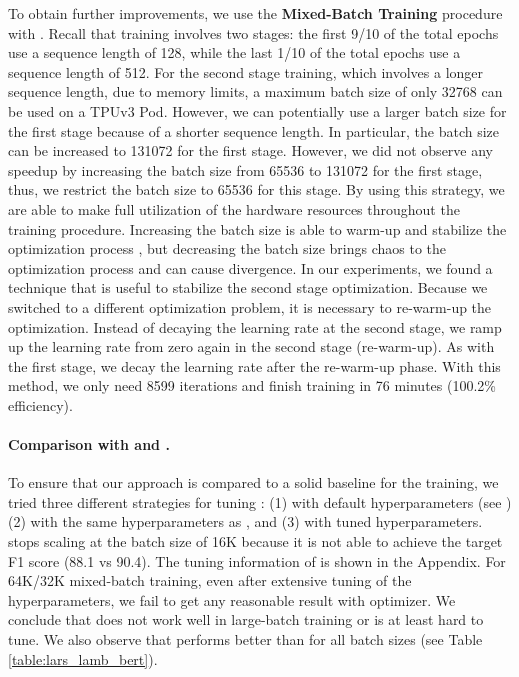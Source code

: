 \documentclass{article} \usepackage{iclr2020_conference,times}
\begin{document}
To obtain further improvements, we use the {\bf Mixed-Batch Training} procedure with . 
Recall that  training involves two stages: the first 9/10 of the total epochs use a sequence length of 128, while the last 1/10 of the total epochs use a sequence length of 512. 
For the second stage training, which involves a longer sequence length, due to memory limits, a maximum batch size of only 32768 can be used on a TPUv3 Pod. However, we can potentially use a larger batch size for the first stage because of a shorter sequence length. 
In particular, the batch size can be increased to 131072 for the first stage. 
However, we did not observe any speedup by increasing the batch size from 65536 to 131072 for the first stage, thus, we restrict the batch size to 65536 for this stage. 
By using this strategy, we are able to make full utilization of the hardware resources throughout the training procedure. 
Increasing the batch size is able to warm-up and stabilize the optimization process \citep{smith2017don}, but decreasing the batch size brings chaos to the optimization process and can cause divergence.
In our experiments, we found a technique that is useful to stabilize the second stage optimization.
Because we switched to a different optimization problem, it is necessary to re-warm-up the optimization.
Instead of decaying the learning rate at the second stage, we ramp up the learning rate from zero again in the second stage (re-warm-up).
As with the first stage, we decay the learning rate after the re-warm-up phase.
With this method, we only need 8599 iterations and finish  training in 76 minutes (100.2\% efficiency).




\paragraph{Comparison with  and .}
To ensure that our approach is compared to a solid baseline for the  training, we tried three different strategies for tuning : (1)  with default hyperparameters (see \cite{devlin2018bert}) (2)  with the same hyperparameters as , and (3)  with tuned hyperparameters.  stops scaling at the batch size of 16K because it is not able to achieve the target F1 score (88.1 vs 90.4). 
The tuning information of  is shown in the Appendix.
For 64K/32K mixed-batch training, even after extensive tuning of the hyperparameters, we fail to get any reasonable result with  optimizer. 
We conclude that  does not work well in large-batch  training or is at least hard to tune.
We also observe that  performs better than  for all batch sizes (see Table \ref{table:lars_lamb_bert}).
\end{document}
